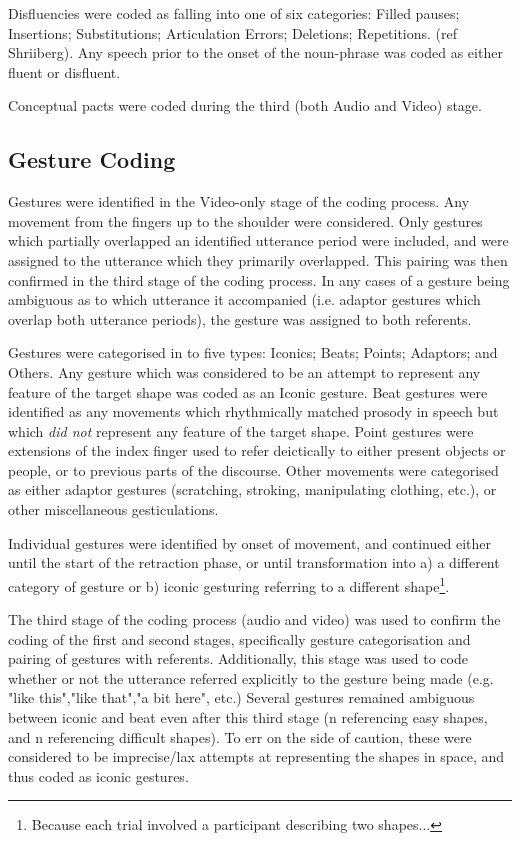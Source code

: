 \documentclass[a4paper,man,natbib]{apa6}
\begin{document}
Disfluencies were coded as falling into one of six categories: Filled pauses; Insertions; Substitutions; Articulation Errors; Deletions; Repetitions. 
(ref Shriiberg).
Any speech prior to the onset of the noun-phrase was coded as either fluent or disfluent.

Conceptual pacts were coded during the third (both Audio and Video) stage. 



\subsection{Gesture Coding}
Gestures were identified in the Video-only stage of the coding process.
Any movement from the fingers up to the shoulder were considered. 
Only gestures which partially overlapped an identified utterance period were included, and were assigned to the utterance which they primarily overlapped. 
This pairing was then confirmed in the third stage of the coding process. 
In any cases of a gesture being ambiguous as to which utterance it accompanied (i.e. adaptor gestures which overlap both utterance periods), the gesture was assigned to both referents.

Gestures were categorised in to five types: Iconics; Beats; Points; Adaptors; and Others. 
Any gesture which was considered to be an attempt to represent any feature of the target shape was coded as an Iconic gesture.
Beat gestures were identified as any movements which rhythmically matched prosody in speech but which \emph{did not} represent any feature of the target shape.
Point gestures were extensions of the index finger used to refer deictically to either present objects or people, or to previous parts of the discourse.
Other movements were categorised as either adaptor gestures (scratching, stroking, manipulating clothing, etc.), or other miscellaneous gesticulations.

Individual gestures were identified by onset of movement, and continued either until the start of the retraction phase, or until transformation into a) a different category of gesture or b) iconic gesturing referring to a different shape\footnote{Because each trial involved a participant describing two shapes...}. 

The third stage of the coding process (audio and video) was used to confirm the coding of the first and second stages, specifically gesture categorisation and pairing of gestures with referents.
Additionally, this stage was used to code whether or not the utterance referred explicitly to the gesture being made (e.g. "like this","like that","a bit here", etc.)
Several gestures remained ambiguous between iconic and beat even after this third stage (n referencing easy shapes, and n referencing difficult shapes).%
To err on the side of caution, these were considered to be imprecise/lax attempts at representing the shapes in space, and thus coded as iconic gestures.
\end{document}
